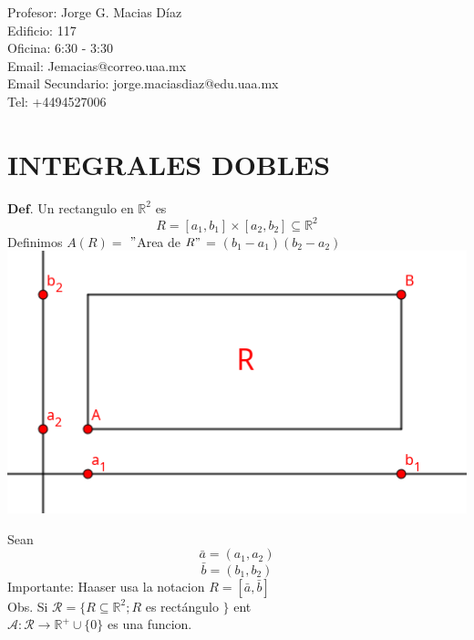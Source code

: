 \documentclass[10pt,a4paper]{article}
\begin{document}
\LARGE
\raggedleft
\color{blue}
\raggedright
\color{black}
Profesor: Jorge G. Macias Díaz \\
Edificio: 117 \\
Oficina: 6:30 - 3:30 \\
Email: Jemacias@correo.uaa.mx \\
Email Secundario: jorge.maciasdiaz@edu.uaa.mx \\
Tel: +4494527006 \\
\section{INTEGRALES DOBLES} 

\color{red} 
$\mathbf{Def.}$
\color{black} 
Un rectangulo en $\mathbb{R} ^2$ es 
$$ R = \left[ a_1,b_1  \right]  \times \left[ a_2 , b_2 \right] \subseteq \mathbb{R}^2 $$
Definimos $ A \left( R \right) =  $ $"$Area de $R "$ = $ \left( b_1 -a_1 \right) \left( b_2-a_2 \right)  $ 
\centering
\includegraphics[scale=0.5]{figuras/img1 } \\
\raggedright
Sean 
$$\bar{a} = \left( a_1 , a_2 \right) $$
$$ \bar{b} = \left( b_1 , b_2 \right)  $$
\color{red}
Importante:
\color{black}
Haaser usa la notacion $ R = \left[ \bar{a} , \bar{b} \right]  $ \\
\color{red}
Obs.
\color{black}
Si $\mathcal{R} = \{ R \subseteq \mathbb{R} ^2 ; R$ es rectángulo  $\}$ ent \\
$ \mathcal{A}: \mathcal{R} \rightarrow \mathbb{R} ^+ \cup \{ 0 \} $ es una funcion. \\
\end{document}
